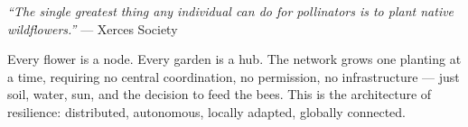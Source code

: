 \documentclass[11pt,letterpaper]{article}
\begin{document}
\begin{quotebox}
\textit{``The single greatest thing any individual can do for pollinators is to plant native wildflowers.''} --- Xerces Society

\vspace{0.5em}
Every flower is a node. Every garden is a hub. The network grows one planting at a time, requiring no central coordination, no permission, no infrastructure --- just soil, water, sun, and the decision to feed the bees. This is the architecture of resilience: distributed, autonomous, locally adapted, globally connected.
\end{quotebox}
\end{document}
